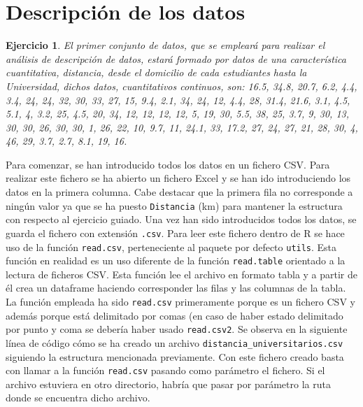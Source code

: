 \documentclass[12pt]{report}\usepackage[]{graphicx}\usepackage[dvipsnames]{xcolor}
\newtheorem{exercise}{Ejercicio}[section]
\begin{document}
		\section{Descripción de los datos}\label{sec:descrip_auto}
		
			\begin{exercise}
				El primer conjunto de datos, que se empleará para realizar el análisis de descripción de datos, estará formado por datos de una característica cuantitativa, distancia, desde el domicilio de cada estudiantes hasta la Universidad, dichos datos, cuantitativos continuos, son: 16.5, 34.8, 20.7, 6.2, 4.4, 3.4, 24, 24, 32, 30, 33, 27, 15, 9.4, 2.1, 34, 24, 12, 4.4, 28, 31.4, 21.6, 3.1, 4.5, 5.1, 4, 3.2, 25, 4.5, 20, 34, 12, 12, 12, 12, 5, 19, 30, 5.5, 38, 25, 3.7, 9, 30, 13, 30, 30, 26, 30, 30, 1, 26, 22, 10, 9.7, 11, 24.1, 33, 17.2, 27, 24, 27, 21, 28, 30, 4, 46, 29, 3.7, 2.7, 8.1, 19, 16.
			\end{exercise}
			
			Para comenzar, se han introducido todos los datos en un fichero CSV. Para realizar este fichero se ha abierto un fichero Excel y se han ido introduciendo los datos en la primera columna. Cabe destacar que la primera fila no corresponde a ningún valor ya que se ha puesto \texttt{Distancia} (km) para mantener la estructura con respecto al ejercicio guiado. Una vez han sido introducidos todos los datos, se guarda el fichero con extensión \texttt{.csv}. Para leer este fichero dentro de R se hace uso de la función \texttt{read.csv}, perteneciente al paquete por defecto \texttt{utils}. Esta función en realidad es un uso diferente de la función \texttt{read.table} orientado a la lectura de ficheros CSV. Esta función lee el archivo en formato tabla y a partir de él crea un dataframe haciendo corresponder las filas y las columnas de la tabla.\\
			
			La función empleada ha sido \texttt{read.csv} primeramente porque es un fichero CSV y además porque está delimitado por comas (en caso de haber estado delimitado por punto y coma se debería haber usado \texttt{read.csv2}. Se observa en la siguiente línea de código cómo se ha creado un archivo \texttt{distancia\_universitarios.csv} siguiendo la estructura mencionada previamente. Con este fichero creado basta con llamar a la función \texttt{read.csv} pasando como parámetro el fichero. Si el archivo estuviera en otro directorio, habría que pasar por parámetro la ruta donde se encuentra dicho archivo.
			
\end{document}
